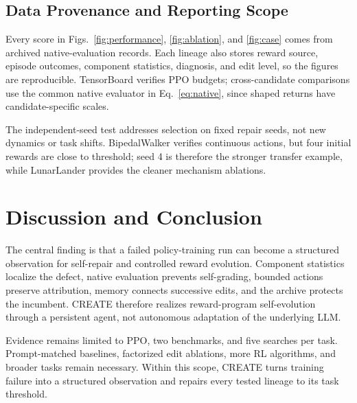\documentclass[conference]{IEEEtran}
\begin{document}
\subsection{Data Provenance and Reporting Scope}
Every score in Figs.~\ref{fig:performance}, \ref{fig:ablation}, and
\ref{fig:case} comes from archived native-evaluation records. Each lineage also
stores reward source, episode outcomes, component statistics, diagnosis, and
edit level, so the figures are reproducible. TensorBoard verifies PPO budgets;
cross-candidate comparisons use the common native evaluator in
Eq.~\eqref{eq:native}, since shaped returns have candidate-specific scales.

The independent-seed test addresses selection on fixed repair seeds, not new
dynamics or task shifts. BipedalWalker verifies continuous actions, but four
initial rewards are close to threshold; seed 4 is therefore the stronger
transfer example, while LunarLander provides the cleaner mechanism ablations.

\section{Discussion and Conclusion}
The central finding is that a failed policy-training run can become a
structured observation for self-repair and controlled reward evolution.
Component statistics localize the defect, native evaluation prevents
self-grading, bounded actions preserve attribution, memory connects successive
edits, and the archive protects the incumbent. CREATE therefore realizes
reward-program self-evolution through a persistent agent, not autonomous
adaptation of the underlying LLM.

Evidence remains limited to PPO, two benchmarks, and five searches per task.
Prompt-matched baselines, factorized edit ablations, more RL algorithms, and
broader tasks remain necessary. Within this scope, CREATE turns training
failure into a structured observation and repairs every tested lineage to its
task threshold.
\end{document}

